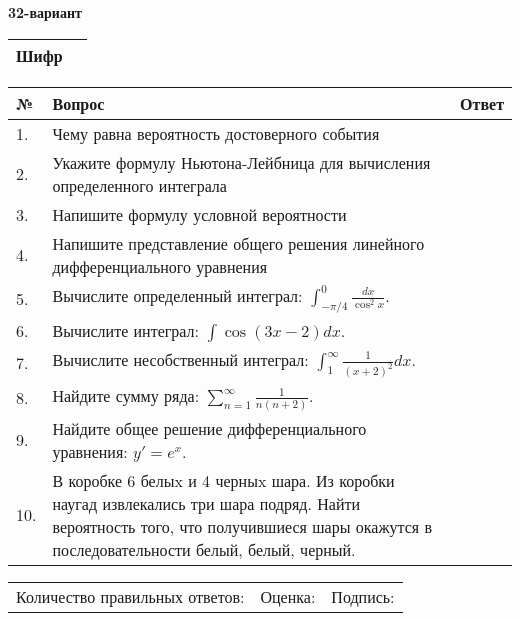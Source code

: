 \documentclass{article}
\begin{document}
  \egroup
  
  \newpage
  
  
  \textbf{32-вариант}\\
  
  \bgroup
  \def\arraystretch{1.6} %
  
  \begin{tabular}{|m{5.7cm}|m{9.5cm}|}
  \hline
  Шифр & \\
  \hline
  \end{tabular}
  
  \vspace{1cm}
  
  \begin{tabular}{|m{0.7cm}|m{10cm}|m{4cm}|}
  \hline
  № & Вопрос & Ответ \\
  \hline
  1. & Чему равна вероятность достоверного события &  \\
  \hline
  2. & Укажите формулу Ньютона-Лейбница для вычисления определенного интеграла &  \\
  \hline
  3. & Напишите формулу условной вероятности &  \\
  \hline
  4. & Напишите представление общего решения линейного дифференциального уравнения &  \\
  \hline
  5. & Вычислите определенный интеграл: \(\int_{-\pi/4}^{0}\frac{dx}{\cos^2x}\). &  \\
  \hline
  6. & Вычислите интеграл: \(\int{\cos(3x - 2)dx}\). &  \\
  \hline
  7. & Вычислите несобственный интеграл: \(\int_{1}^{\infty}{\frac{1}{(x + 2)^{2}}dx}\). &  \\
  \hline
  8. & Найдите сумму ряда: \(\sum_{n = 1}^{\infty}\frac{1}{n(n + 2)}\). &  \\
  \hline
  9. & Найдите общее решение дифференциального уравнения: \(y' = e^{x}\). &  \\
  \hline
  10. & В коробке 6 белыx и 4 черныx шара. Из коробки наугад извлекались три шара подряд. Найти вероятность того, что получившиеся шары окажутся в последовательности белый, белый, черный. &  \\
  \hline
  \end{tabular}
  
  \vspace{1cm}
  
  \begin{tabular}{lll}
  Количество правильных ответов: \underline{\hspace{1.5cm}} & 
  Оценка: \underline{\hspace{1.5cm}} & 
  Подпись: \underline{\hspace{2cm}} \\
  \end{tabular}
  
\end{document}
